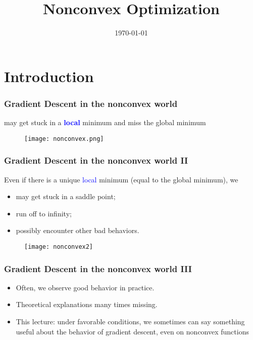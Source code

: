 \documentclass[aspectratio=149]{beamer}
\title{Nonconvex Optimization}
\date{\today}
\begin{document}
\maketitle
\frame{\tableofcontents}

\section{Introduction}

\begin{frame}
  \frametitle{Gradient Descent in the nonconvex world}

  may get stuck in a \textbf{\textcolor{blue}{local}} minimum and miss the global minimum

  \begin{figure}[ht]
    \centering
    \texttt{[image: nonconvex.png]}
  \end{figure}
\end{frame}


\begin{frame}
  \frametitle{Gradient Descent in the nonconvex world II}
  Even if there is a unique \textcolor{blue}{local} minimum (equal to the global minimum), we
  \begin{itemize}
    \item  may get stuck in a saddle point;
    \item run off to infinity;
    \item possibly encounter other bad behaviors.
  \end{itemize}
  \begin{figure}[ht]
    \centering
    \texttt{[image: nonconvex2]}
  \end{figure}
\end{frame}


\begin{frame}
  \frametitle{Gradient Descent in the nonconvex world III}
  \begin{itemize}
    \item Often, we observe good behavior in practice.
    \item Theoretical explanations many times missing.
    \item This lecture: under favorable conditions, we sometimes can say something useful about
  the behavior of gradient descent, even on nonconvex functions
  \end{itemize}
\end{frame}
\end{document}
